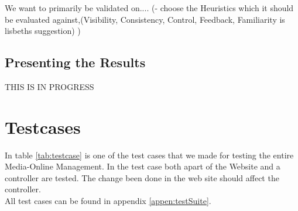 We want to primarily be validated on....
(- choose the Heuristics which it should be evaluated against,(Visibility, Consistency, Control, Feedback, Familiarity is lisbeths suggestion) ) 


\subsection{Presenting the Results}
 THIS IS IN PROGRESS

\section{Testcases}
\label{sec:testcase}
In table \ref{tab:testcase} is one of the test cases that we made for testing the entire Media-Online Management. In the test case both apart of the Website and a controller are tested. The change been done in the web site should affect the controller.\\ 
 All test cases can be found in appendix \vref{appen:testSuite}.
